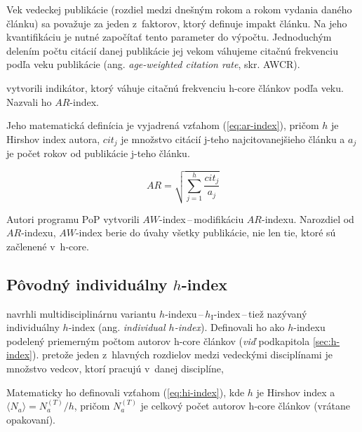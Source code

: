 Vek vedeckej publikácie (rozdiel medzi dnešným rokom a rokom vydania daného
článku) sa považuje za jeden z~faktorov, ktorý definuje impakt článku.  Na jeho
kvantifikáciu je nutné započítať tento parameter do výpočtu.  Jednoduchým
delením počtu citácií danej publikácie jej vekom váhujeme citačnú frekvenciu
podľa veku publikácie (ang. \emph{age-weighted citation rate}, skr. AWCR).

\citet{Jin2007} vytvorili indikátor, ktorý váhuje citačnú frekvenciu h-core
článkov podľa veku.  Nazvali ho $\mathit{AR}$-index.

Jeho matematická definícia je vyjadrená vzťahom (\ref{eq:ar-index}), pričom $h$ je
Hirshov index autora, $\mathit{cit}_j$ je množstvo citácií j-teho
najcitovanejšieho článku a $a_j$ je počet rokov od publikácie j-teho článku.

\begin{equation}
\label{eq:ar-index}
\mathit{AR} = \sqrt{\sum_{j=1}^h{\frac{\mathit{cit}_j}{a_j}}}
\end{equation}

Autori programu PoP
 vytvorili
$\mathit{AW}$-index\,--\,modifikáciu $\mathit{AR}$-indexu.  Narozdiel od
$\mathit{AR}$-indexu, $\mathit{AW}$-index berie do úvahy všetky publikácie, nie
len tie, ktoré sú začlenené v~h-core.


\subsection{Pôvodný individuálny $h$-index}
\label{sec:hi-index}

\citet{Batista2006} navrhli multidisciplinárnu variantu
$h$-indexu\,--\,$h_{\mathrm{I}}$-index\,--\,tiež nazývaný individuálny $h$-index (ang.
\emph{individual $h$-index}).  Definovali ho ako $h$-indexu podelený priemerným
počtom autorov h-core článkov (\emph{viď} podkapitola \ref{sec:h-index}).
pretože jeden z~hlavných rozdielov medzi vedeckými disciplínami je
množstvo vedcov, ktorí pracujú v~danej disciplíne,

 
Matematicky ho definovali vzťahom (\ref{eq:hi-index}), kde $h$ je Hirshov index a
$\langle N_a \rangle = N_a^{(T)} / h$, pričom $N_a^{(T)}$ je celkový počet
autorov h-core článkov (vrátane opakovaní).

